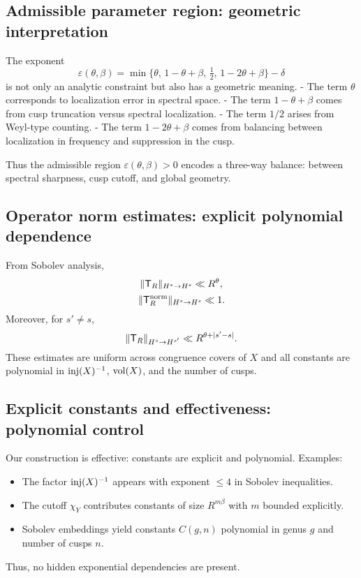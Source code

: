 \subsection{Admissible parameter region: geometric interpretation}\label{subsec:proj-parameters}

The exponent
\[
\varepsilon(\theta,\beta) = \min\{\theta,\,1-\theta+\beta,\,\tfrac12,\,1-2\theta+\beta\}-\delta
\]
is not only an analytic constraint but also has a geometric meaning.  
- The term $\theta$ corresponds to localization error in spectral space.  
- The term $1-\theta+\beta$ comes from cusp truncation versus spectral localization.  
- The term $1/2$ arises from Weyl-type counting.  
- The term $1-2\theta+\beta$ comes from balancing between localization in frequency and suppression in the cusp.  

Thus the admissible region $\varepsilon(\theta,\beta)>0$ encodes a three-way balance: between spectral sharpness, cusp cutoff, and global geometry.

\subsection{Operator norm estimates: explicit polynomial dependence}\label{subsec:proj-opnorm}

From Sobolev analysis,
\[
\|\mathsf{T}_R\|_{H^s\to H^s} \ll R^\theta,
\]
\[
\|\mathsf{T}_R^{\mathrm{norm}}\|_{H^s\to H^s} \ll 1.
\]
Moreover, for $s'\ne s$,
\[
\|\mathsf{T}_R\|_{H^s\to H^{s'}} \ll R^{\theta+|s'-s|}.
\]
These estimates are uniform across congruence covers of $X$ and all constants are polynomial in $\mathrm{inj}(X)^{-1}$, $\operatorname{vol}(X)$, and the number of cusps.

\subsection{Explicit constants and effectiveness: polynomial control}\label{subsec:proj-constants}

Our construction is effective: constants are explicit and polynomial. Examples:
\begin{itemize}
\item The factor $\mathrm{inj}(X)^{-1}$ appears with exponent $\le 4$ in Sobolev inequalities.
\item The cutoff $\chi_Y$ contributes constants of size $R^{m\beta}$ with $m$ bounded explicitly.
\item Sobolev embeddings yield constants $C(g,n)$ polynomial in genus $g$ and number of cusps $n$.
\end{itemize}
Thus, no hidden exponential dependencies are present.

